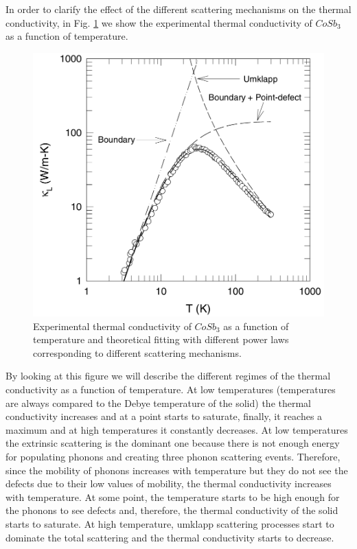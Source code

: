 In order to clarify the effect of the different scattering mechanisms on the thermal conductivity, in Fig. \ref{prototypical} we show the experimental thermal conductivity of $CoSb_{3}$\cite{yang2002influence} as a 
function of temperature.
\begin{figure}[h]
\begin{center}
\includegraphics[width=0.7\linewidth]{Figures/prototypical-solid.png}
\caption[Thermal conductivity of $CoSb_{3}$]{Experimental thermal conductivity of $CoSb_{3}$\cite{yang2002influence} as a function of temperature and theoretical fitting with different power laws corresponding to different 
scattering mechanisms.}
\label{prototypical}
\end{center}
\end{figure}
By looking at this figure we will describe the different regimes of the thermal conductivity as a function of temperature. At low temperatures (temperatures are always 
compared to the Debye temperature of the solid) the thermal conductivity increases and at a point starts to saturate, finally, it reaches a maximum and at high temperatures it constantly decreases. At low 
temperatures the extrinsic scattering is the dominant one because there is not enough energy for populating phonons and creating three phonon scattering events. Therefore, since the mobility of phonons increases 
with temperature but they do not see the defects due to their low values of mobility, the thermal conductivity increases with temperature. At some point, the temperature starts to be high enough for the 
phonons to see defects and, therefore, the thermal conductivity of the solid starts to saturate. At high 
temperature, umklapp scattering processes start to dominate the total scattering and the thermal conductivity starts 
to decrease. \\

